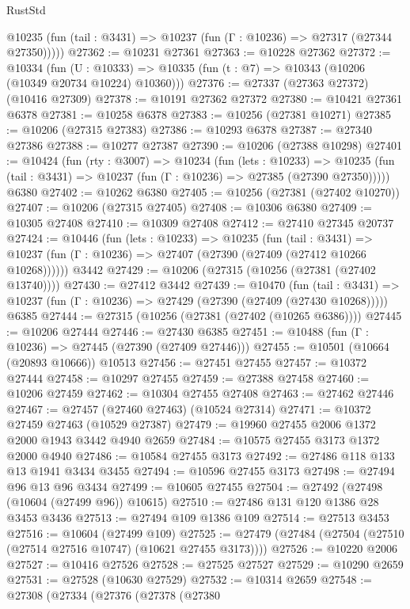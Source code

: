 \begin{lexlean}{RustStd}
\begin{coremodule}
      @10235 (fun (tail : @3431) => @10237 (fun (Γ : @10236) => @27317 (@27344 @27350)))))
@27362 := @10231 @27361
@27363 := @10228 @27362
@27372 := @10334
    (fun (U : @10333) => @10335 (fun (t : @7) => @10343 (@10206 (@10349 @20734 @10224) @10360)))
@27376 := @27337 (@27363 @27372) (@10416 @27309)
@27378 := @10191 @27362 @27372
@27380 := @10421 @27361 @6378
@27381 := @10258 @6378
@27383 := @10256 (@27381 @10271)
@27385 := @10206 (@27315 @27383)
@27386 := @10293 @6378
@27387 := @27340 @27386
@27388 := @10277 @27387
@27390 := @10206 (@27388 @10298)
@27401 := @10424
    (fun (rty : @3007) =>
    @10234
      (fun (lets : @10233) =>
      @10235 (fun (tail : @3431) => @10237 (fun (Γ : @10236) => @27385 (@27390 @27350)))))
    @6380
@27402 := @10262 @6380
@27405 := @10256 (@27381 (@27402 @10270))
@27407 := @10206 (@27315 @27405)
@27408 := @10306 @6380
@27409 := @10305 @27408
@27410 := @10309 @27408
@27412 := @27410 @27345 @20737
@27424 := @10446
    (fun (lets : @10233) =>
    @10235
      (fun (tail : @3431) =>
      @10237 (fun (Γ : @10236) => @27407 (@27390 (@27409 (@27412 @10266 @10268))))))
    @3442
@27429 := @10206 (@27315 (@10256 (@27381 (@27402 @13740))))
@27430 := @27412 @3442
@27439 := @10470
    (fun (tail : @3431) => @10237 (fun (Γ : @10236) => @27429 (@27390 (@27409 (@27430 @10268)))))
    @6385
@27444 := @27315 (@10256 (@27381 (@27402 (@10265 @6386))))
@27445 := @10206 @27444
@27446 := @27430 @6385
@27451 := @10488 (fun (Γ : @10236) => @27445 (@27390 (@27409 @27446)))
@27455 := @10501 (@10664 (@20893 @10666)) @10513
@27456 := @27451 @27455
@27457 := @10372 @27444
@27458 := @10297 @27455
@27459 := @27388 @27458
@27460 := @10206 @27459
@27462 := @10304 @27455 @27408
@27463 := @27462 @27446
@27467 := @27457 (@27460 @27463) (@10524 @27314)
@27471 := @10372 @27459 @27463 (@10529 @27387)
@27479 := @19960 @27455 @2006 @1372 @2000 @1943 @3442 @4940 @2659
@27484 := @10575 @27455 @3173 @1372 @2000 @4940
@27486 := @10584 @27455 @3173
@27492 := @27486 @118 @133 @13 @1941 @3434 @3455
@27494 := @10596 @27455 @3173
@27498 := @27494 @96 @13 @96 @3434
@27499 := @10605 @27455
@27504 := @27492 (@27498 (@10604 (@27499 @96)) @10615)
@27510 := @27486 @131 @120 @1386 @28 @3453 @3436
@27513 := @27494 @109 @1386 @109
@27514 := @27513 @3453
@27516 := @10604 (@27499 @109)
@27525 := @27479 (@27484 (@27504 (@27510 (@27514 @27516 @10747) (@10621 @27455 @3173))))
@27526 := @10220 @2006
@27527 := @10416 @27526
@27528 := @27525 @27527
@27529 := @10290 @2659
@27531 := @27528 (@10630 @27529)
@27532 := @10314 @2659
@27548 := @27308
    (@27334
      (@27376
        (@27378
          (@27380

\end{coremodule}
\end{lexlean}
